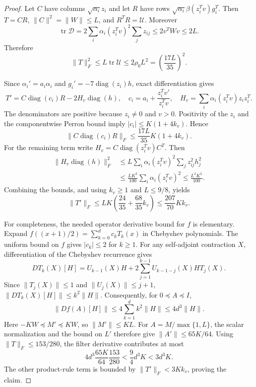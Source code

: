 \documentclass[11pt]{amsart}
\theoremstyle{definition}\newtheorem{definition}[theorem]{Definition}
\theoremstyle{remark}\newtheorem{remark}[theorem]{Remark}
\numberwithin{equation}{section}
\begin{document}
\begin{proof}
Let $C$ have columns $\sqrt{\alpha_i}z_i$ and let $R$ have rows
$\sqrt{\alpha_i}\beta(z_i^Tv)g_i^T$. Then $T=CR$,
$\|C\|^2=\|W\|\le L$, and $R^TR=\mathcal U$. Moreover
\[
 \operatorname{tr}\mathcal D
 =2\sum_i\alpha_i(z_i^Tv)^2\sum_jz_{ij}
 \le2v^TWv\le2L.
\]
Therefore
\[
 \|T\|_F^2\le L\operatorname{tr}\mathcal U
 \le2\rho_0L^2=\left(\frac{17L}{35}\right)^2.
\]

Since $\alpha_i'=a_i\alpha_i$ and
$g_i'=-7\operatorname{diag}(z_i)h$, exact differentiation gives
\[
 T'=C\operatorname{diag}(c_i)R-2H_v\operatorname{diag}(h),
 \quad c_i=a_i+\frac{z_i^Tv'}{z_i^Tv},
 \quad H_v=\sum_i\alpha_i(z_i^Tv)z_i z_i^T.
\]
The denominators are positive because $z_i\ne0$ and $v>0$.
Positivity of the $z_i$ and the componentwise Perron bound imply
$|c_i|\le K(1+4k_v)$. Hence
\[
 \|C\operatorname{diag}(c_i)R\|_F
 \le\frac{17L}{35}K(1+4k_v).
\]
For the remaining term write $H_v=C\operatorname{diag}(z_i^Tv)C^T$.
Then
\begin{align*}
 \|H_v\operatorname{diag}(h)\|_F^2
 &\le L\sum_i\alpha_i(z_i^Tv)^2
                  \sum_jz_{ij}^2h_j^2\\
 &\le\frac{LK^2}{100}\sum_i\alpha_i(z_i^Tv)^2
 \le\frac{L^2K^2}{100}.
\end{align*}
Combining the bounds, and using $k_v\ge1$ and $L\le9/8$, yields
\[
 \|T'\|_F
 \le LK\left(\frac{24}{35}+\frac{68}{35}k_v\right)
 \le\frac{207}{70}Kk_v.
\]

For completeness, the needed operator derivative bound for $f$ is
elementary. Expand $f((x+1)/2)=\sum_{k=0}^d c_kT_k(x)$ in Chebyshev
polynomials. The uniform bound on $f$ gives $|c_k|\le2$ for $k\ge1$.
For any self-adjoint contraction $X$, differentiation of the Chebyshev
recurrence gives
\[
 D T_k(X)[H]
 =U_{k-1}(X)H
    +2\sum_{j=1}^{k-1}U_{k-1-j}(X)H T_j(X).
\]
Since $\|T_j(X)\|\le1$ and $\|U_j(X)\|\le j+1$,
$\|D T_k(X)[H]\|\le k^2\|H\|$. Consequently, for $0\preceq A\preceq I$,
\[
 \|Df(A)[H]\|
 \le4\sum_{k=1}^d k^2\|H\|
 \le4d^3\|H\|.
\]
Here $-KW\preceq M'\preceq KW$, so $\|M'\|\le KL$.
For $A=M/\max\{1,L\}$, the scalar normalization and the bound on $L'$
therefore give $\|A'\|\le65K/64$. Using
$\|T\|_F\le153/280$, the filter derivative contributes at most
\[
 4d^3\frac{65K}{64}\frac{153}{280}
 <\frac94d^3K<3d^3K.
\]
The other product-rule term is bounded by $\|T'\|_F<3Kk_v$,
proving the claim.
\end{proof}
\end{document}
